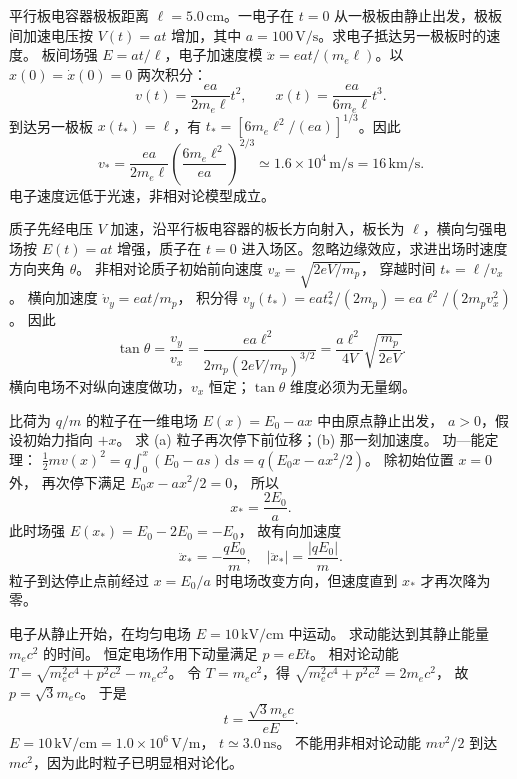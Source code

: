 
平行板电容器极板距离 $\ell=5.0\,\mathrm{cm}$。一电子在 $t=0$ 从一极板由静止出发，极板间加速电压按 $V(t)=at$ 增加，其中 $a=100\,\mathrm{V/s}$。求电子抵达另一极板时的速度。
\exsolution
板间场强 $E=at/\ell$，电子加速度模
$\ddot x=eat/(m_e\ell)$。以 $x(0)=\dot x(0)=0$ 两次积分：
\[
v(t)=\frac{ea}{2m_e\ell}t^2,\qquad
x(t)=\frac{ea}{6m_e\ell}t^3.
\]
到达另一极板 $x(t_*)=\ell$，有
$t_*=[6m_e\ell^2/(ea)]^{1/3}$。因此
\[
\boxed{v_*=\frac{ea}{2m_e\ell}
\left(\frac{6m_e\ell^2}{ea}\right)^{2/3}
\simeq1.6\times10^4\,\mathrm{m/s}=16\,\mathrm{km/s}}.
\]
\excheck 电子速度远低于光速，非相对论模型成立。

质子先经电压 $V$ 加速，沿平行板电容器的板长方向射入，板长为 $\ell$，横向匀强电场按 $E(t)=at$ 增强，质子在 $t=0$ 进入场区。忽略边缘效应，求进出场时速度方向夹角 $\theta$。
\exsolution
非相对论质子初始前向速度
$v_x=\sqrt{2eV/m_p}$，
穿越时间 $t_*=\ell/v_x$。
横向加速度
$\dot v_y=ea t/m_p$，
积分得
$v_y(t_*)=ea t_*^2/(2m_p)
=ea\ell^2/(2m_pv_x^2)$。
因此
\[
\boxed{\tan\theta=\frac{v_y}{v_x}
=\frac{ea\ell^2}{2m_p(2eV/m_p)^{3/2}}
=\frac{a\ell^2}{4V}\sqrt{\frac{m_p}{2eV}}}.
\]
\excheck 横向电场不对纵向速度做功，$v_x$ 恒定；$\tan\theta$ 维度必须为无量纲。

比荷为 $q/m$ 的粒子在一维电场
$E(x)=E_0-ax$ 中由原点静止出发，
$a>0$，假设初始力指向 $+x$。
求 (a) 粒子再次停下前位移；(b) 那一刻加速度。
\exsolution
功—能定理：
$\frac12mv(x)^2=q\int_0^x(E_0-as)\,\mathrm ds
=q(E_0x-ax^2/2)$。
除初始位置 $x=0$ 外，
再次停下满足
$E_0x-ax^2/2=0$，
所以
\[
\boxed{x_*=\frac{2E_0}{a}}.
\]
此时场强
$E(x_*)=E_0-2E_0=-E_0$，
故有向加速度
\[
\boxed{\ddot x_*=-\frac{qE_0}{m}},
\quad |\ddot x_*|=\frac{|qE_0|}{m}.
\]
\excheck 粒子到达停止点前经过 $x=E_0/a$ 时电场改变方向，但速度直到 $x_*$ 才再次降为零。

电子从静止开始，在均匀电场
$E=10\,\mathrm{kV/cm}$ 中运动。
求动能达到其静止能量 $m_ec^2$ 的时间。
\exsolution
恒定电场作用下动量满足
$p=eEt$。
相对论动能
$T=\sqrt{m_e^2c^4+p^2c^2}-m_ec^2$。
令 $T=m_ec^2$，得
$\sqrt{m_e^2c^4+p^2c^2}=2m_ec^2$，
故 $p=\sqrt3m_ec$。
于是
\[
\boxed{t=\frac{\sqrt3m_ec}{eE}}.
\]
$E=10\,\mathrm{kV/cm}=1.0\times10^6\,\mathrm{V/m}$，
$\boxed{t\simeq3.0\,\mathrm{ns}}$。
\excheck 不能用非相对论动能 $mv^2/2$ 到达 $mc^2$，因为此时粒子已明显相对论化。

